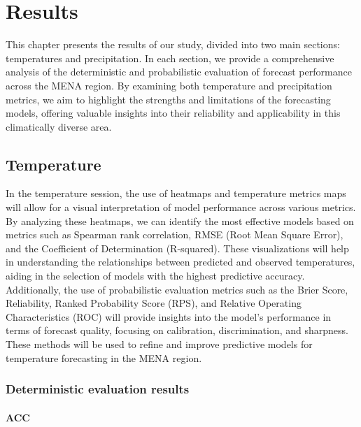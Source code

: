 \chapter{Results}
This chapter presents the results of our study, divided into two main sections: temperatures and precipitation. In each section, we provide a comprehensive analysis of the deterministic and probabilistic evaluation of forecast performance across the MENA region. By examining both temperature and precipitation metrics, we aim to highlight the strengths and limitations of the forecasting models, offering valuable insights into their reliability and applicability in this climatically diverse area.
\section{Temperature}

In the temperature session, the use of heatmaps and temperature metrics maps will allow for a visual interpretation of model performance across various metrics. By analyzing these heatmaps, we can identify the most effective models based on metrics such as Spearman rank correlation, RMSE (Root Mean Square Error), and the Coefficient of Determination (R-squared). These visualizations will help in understanding the relationships between predicted and observed temperatures, aiding in the selection of models with the highest predictive accuracy. Additionally, the use of probabilistic evaluation metrics such as the Brier Score, Reliability, Ranked Probability Score (RPS), and Relative Operating Characteristics (ROC) will provide insights into the model's performance in terms of forecast quality, focusing on calibration, discrimination, and sharpness. These methods will be used to refine and improve predictive models for temperature forecasting in the MENA region.
\subsection{Deterministic evaluation results}

\subsubsection{ACC}

